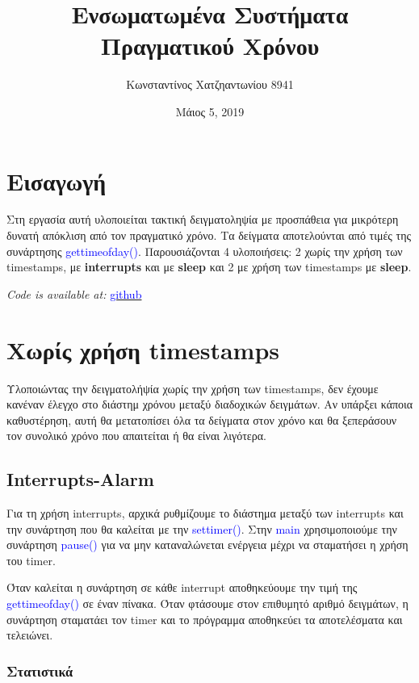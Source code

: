 \documentclass[12pt,a4paper]{article}
\author{Κωνσταντίνος Χατζηαντωνίου 8941}
\title{Ενσωματωμένα Συστήματα Πραγματικού Χρόνου}
\date{Μάιος 5, 2019}
\begin{document}
\maketitle

\section*{Εισαγωγή}

Στη εργασία αυτή υλοποιείται τακτική δειγματοληψία με προσπάθεια για μικρότερη δυνατή απόκλιση από τον πραγματικό χρόνο. Τα δείγματα αποτελούνται από τιμές της συνάρτησης  \textcolor{blue}{gettimeofday()}. Παρουσιάζονται 4 υλοποιήσεις: 2 χωρίς την χρήση των timestamps, με \textbf{interrupts} και με \textbf{sleep} και 2 με χρήση των timestamps με \textbf{sleep}.

\noindent
\textit{Code is available at:} \href{https://github.com/KonstantinosChatziantoniou/RealTimeEmbeddedSystems_Course}{\textcolor{blue}{github}}

\section{Χωρίς χρήση timestamps}

Υλοποιώντας την δειγματολήψία χωρίς την χρήση των timestamps, δεν έχουμε κανέναν έλεγχο στο διάστημ χρόνου μεταξύ διαδοχικών δειγμάτων. Αν υπάρξει κάποια καθυστέρηση, αυτή θα μετατοπίσει όλα τα δείγματα στον χρόνο και θα ξεπεράσουν τον συνολικό χρόνο που απαιτείται ή θα είναι λιγότερα.

\subsection{Interrupts-Alarm}
Για τη χρήση interrupts, αρχικά ρυθμίζουμε το διάστημα μεταξύ των interrupts και την συνάρτηση που θα καλείται με την \textcolor{blue}{settimer()}. Στην \textcolor{blue}{main} χρησιμοποιούμε την συνάρτηση \textcolor{blue}{pause()} για να μην καταναλώνεται ενέργεια μέχρι να σταματήσει η χρήση του timer.

Όταν καλείται η συνάρτηση σε κάθε interrupt αποθηκεύουμε την τιμή της  \textcolor{blue}{gettimeofday()} σε έναν πίνακα. Όταν φτάσουμε στον επιθυμητό αριθμό δειγμάτων, η συνάρτηση σταματάει τον timer και το πρόγραμμα αποθηκεύει τα αποτελέσματα και τελειώνει.

\subsubsection*{Στατιστικά}
\end{document}

